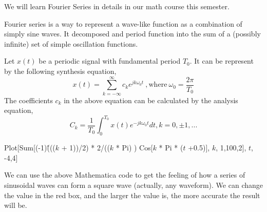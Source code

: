 \documentclass[a4paper]{report}
\begin{document}
We will learn Fourier Series in details in our math course this semester.

Fourier series is a way to represent a wave-like function as a combination of simply sine waves. It decomposed and period function into the sum of a (possibly infinite) set of simple oscillation functions.

Let $x(t)$ be a periodic signal with fundamental period $T_0$. It can be represent by the following synthesis equation,
$$x(t)=\sum_{k=-\infty}^{\infty}c_ke^{jk\omega_0t}\ ,\mathrm{where}\ \omega_0=\frac{2\pi}{T_0}$$
The coefficients $c_k$ in the above equation can be calculated by the analysis
equation,
$$C_k=\frac{1}{T_0}\int_0^{T_0}x(t)e^{-jk\omega_0t}dt,k=0,\pm 1,...$$

Plot[Sum[(-1)\^((($k$ + 1))/2) * 2/(($k$ * Pi) ) Cos[$k$ * Pi * ($t$ +0.5)], {$k$, 1,100,2}], {$t$, -4,4}]

We can use the above Mathematica code to get the feeling of how a series of sinusoidal waves can form a square wave (actually, any waveform). We can change the value in the red box, and the larger the value is, the more accurate the result will be.
\end{document}
